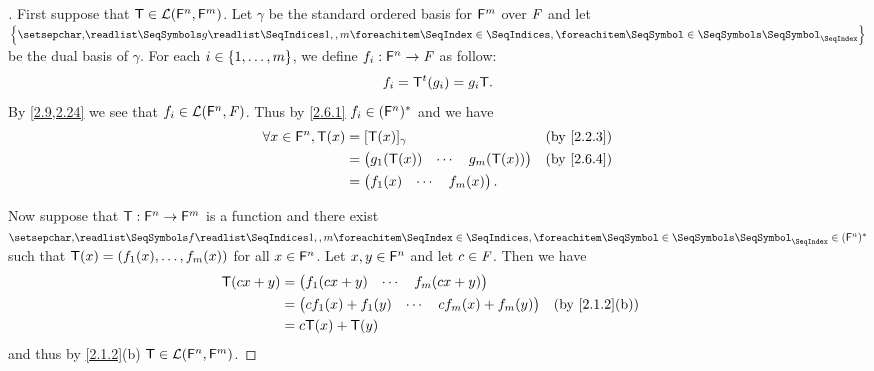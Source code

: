 \begin{proof}[]
  First suppose that \(\mathsf{T} \in \mathcal{L}(\mathsf{F}^n, \mathsf{F}^m)\).
  Let \(\gamma\) be the standard ordered basis for \(\mathsf{F}^m\) over \(\mathit{F}\) and let \(\set{\seq{g}{1,,m}}\) be the dual basis of \(\gamma\).
  For each \(i \in \left\lbrace1, \dots, m\right\rbrace\), we define \(f_i : \mathsf{F}^n \to \mathit{F}\) as follow:
  \[
    f_i = {\mathsf{T}}^{t}(g_i) = g_i \mathsf{T}.
  \]
  By \cref{2.9,2.24} we see that \(f_i \in \mathcal{L}(\mathsf{F}^n, \mathit{F})\).
  Thus by \cref{2.6.1} \(f_i \in (\mathsf{F}^n)^*\) and we have
  \begin{align*}
    \forall x \in \vs{F}^n, \T(x) & = [\T(x)]_{\gamma}                &  & \text{(by \cref{2.2.3})} \\
                                  & = \begin{pmatrix}
                                        g_1(\T(x)) & \cdots & g_m(\T(x))
                                      \end{pmatrix} &  & \text{(by \cref{2.6.4})}                   \\
                                  & = \begin{pmatrix}
                                        f_1(x) & \cdots & f_m(x)
                                      \end{pmatrix}.
  \end{align*}

  Now suppose that \(\mathsf{T} : \mathsf{F}^n \to \mathsf{F}^m\) is a function and there exist \(\seq{f}{1,,m} \in (\vs{F}^n)^*\) such that \(\mathsf{T}(x) = (f_1(x), \dots, f_m(x))\) for all \(x \in \mathsf{F}^n\).
  Let \(x, y \in \mathsf{F}^n\) and let \(c \in \mathit{F}\).
  Then we have
  \begin{align*}
    \T(cx + y) & = \begin{pmatrix}
                     f_1(cx + y) & \cdots & f_m(cx + y)
                   \end{pmatrix}             \\
               & = \begin{pmatrix}
                     c f_1(x) + f_1(y) & \cdots & c f_m(x) + f_m(y)
                   \end{pmatrix} &  & \text{(by \cref{2.1.2}(b))} \\
               & = c \T(x) + \T(y)
  \end{align*}
  and thus by \cref{2.1.2}(b) \(\mathsf{T} \in \mathcal{L}(\mathsf{F}^n, \mathsf{F}^m)\).
\end{proof}
